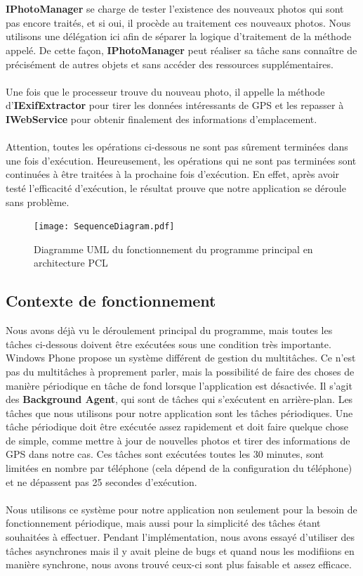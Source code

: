 \documentclass{article}
\begin{document}
\\\\
{\bf IPhotoManager} se charge de tester l’existence des nouveaux photos qui sont pas encore traités, et si oui, il procède au traitement ces nouveaux photos. Nous utilisons une délégation ici afin de séparer la logique d’traitement de la méthode appelé.  De cette façon, {\bf IPhotoManager} peut réaliser sa tâche sans connaître de précisément de autres objets et sans accéder des ressources supplémentaires.
\\\\
Une fois que le processeur trouve du nouveau photo, il appelle la méthode d’{\bf IExifExtractor} pour tirer les données intéressants de GPS et les repasser à {\bf IWebService} pour obtenir finalement des informations d’emplacement.
\\\\
Attention, toutes les opérations ci-dessous ne sont pas sûrement terminées dans une fois d’exécution. Heureusement, les opérations qui ne sont pas terminées sont continuées à être traitées à la prochaine fois d’exécution. En effet, après avoir testé l’efficacité d’exécution, le résultat prouve que notre application se déroule sans problème.


\begin{figure}[h!]
\centering
\texttt{[image: SequenceDiagram.pdf]}
\caption{Diagramme UML du fonctionnement du programme principal en architecture PCL}
\end{figure}
\newpage

\vspace{0.2 cm}
\subsection{\Large Contexte de fonctionnement}

Nous avons déjà vu le déroulement principal du programme, mais toutes les tâches ci-dessous doivent être exécutées sous une condition très importante. Windows Phone propose un système différent de gestion du multitâches. Ce n’est pas du multitâches à proprement parler, mais la possibilité de faire des choses de manière périodique en tâche de fond lorsque l’application est désactivée. Il s’agit des {\bf{Background Agent}}, qui sont de tâches qui s’exécutent en arrière-plan. Les tâches que nous utilisons pour notre application sont les tâches périodiques. Une tâche périodique doit être exécutée assez rapidement et doit faire quelque chose de simple, comme mettre à jour de nouvelles photos et tirer des informations de GPS dans notre cas. Ces tâches sont exécutées toutes les 30 minutes, sont limitées en nombre par téléphone (cela dépend de la configuration du téléphone) et ne dépassent pas 25 secondes d’exécution.
\\\\
Nous utilisons ce système pour notre application non seulement pour la besoin de fonctionnement périodique, mais aussi pour la simplicité des tâches étant souhaitées à effectuer. Pendant l’implémentation, nous avons essayé d’utiliser des tâches asynchrones mais il y avait pleine de bugs et quand nous les modifiions en manière synchrone, nous avons trouvé ceux-ci  sont plus faisable et assez efficace.
\end{document}
